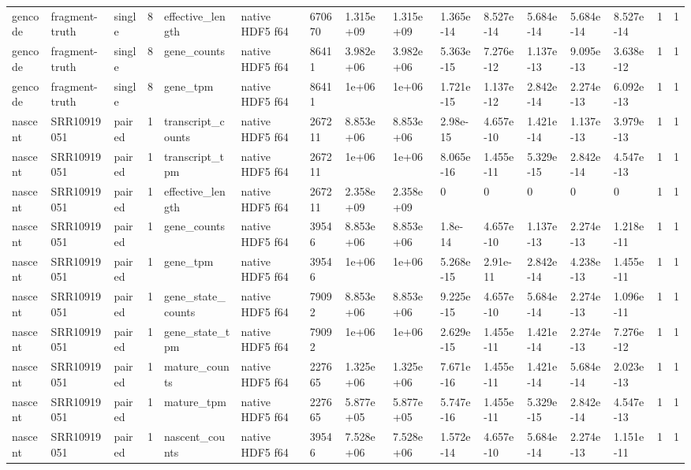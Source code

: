 \begin{tabular}{llllllllllllllll}
gencode & fragment-truth & single & 8 & effective\_length & native HDF5 f64 & 670670 & 1.315e+09 & 1.315e+09 & 1.365e-14 & 8.527e-14 & 5.684e-14 & 5.684e-14 & 8.527e-14 & 1 & 1 \\
gencode & fragment-truth & single & 8 & gene\_counts & native HDF5 f64 & 86411 & 3.982e+06 & 3.982e+06 & 5.363e-15 & 7.276e-12 & 1.137e-13 & 9.095e-13 & 3.638e-12 & 1 & 1 \\
gencode & fragment-truth & single & 8 & gene\_tpm & native HDF5 f64 & 86411 & 1e+06 & 1e+06 & 1.721e-15 & 1.137e-12 & 2.842e-14 & 2.274e-13 & 6.092e-13 & 1 & 1 \\
nascent & SRR10919051 & paired & 1 & transcript\_counts & native HDF5 f64 & 267211 & 8.853e+06 & 8.853e+06 & 2.98e-15 & 4.657e-10 & 1.421e-14 & 1.137e-13 & 3.979e-13 & 1 & 1 \\
nascent & SRR10919051 & paired & 1 & transcript\_tpm & native HDF5 f64 & 267211 & 1e+06 & 1e+06 & 8.065e-16 & 1.455e-11 & 5.329e-15 & 2.842e-14 & 4.547e-13 & 1 & 1 \\
nascent & SRR10919051 & paired & 1 & effective\_length & native HDF5 f64 & 267211 & 2.358e+09 & 2.358e+09 & 0 & 0 & 0 & 0 & 0 & 1 & 1 \\
nascent & SRR10919051 & paired & 1 & gene\_counts & native HDF5 f64 & 39546 & 8.853e+06 & 8.853e+06 & 1.8e-14 & 4.657e-10 & 1.137e-13 & 2.274e-13 & 1.218e-11 & 1 & 1 \\
nascent & SRR10919051 & paired & 1 & gene\_tpm & native HDF5 f64 & 39546 & 1e+06 & 1e+06 & 5.268e-15 & 2.91e-11 & 2.842e-14 & 4.238e-13 & 1.455e-11 & 1 & 1 \\
nascent & SRR10919051 & paired & 1 & gene\_state\_counts & native HDF5 f64 & 79092 & 8.853e+06 & 8.853e+06 & 9.225e-15 & 4.657e-10 & 5.684e-14 & 2.274e-13 & 1.096e-11 & 1 & 1 \\
nascent & SRR10919051 & paired & 1 & gene\_state\_tpm & native HDF5 f64 & 79092 & 1e+06 & 1e+06 & 2.629e-15 & 1.455e-11 & 1.421e-14 & 2.274e-13 & 7.276e-12 & 1 & 1 \\
nascent & SRR10919051 & paired & 1 & mature\_counts & native HDF5 f64 & 227665 & 1.325e+06 & 1.325e+06 & 7.671e-16 & 1.455e-11 & 1.421e-14 & 5.684e-14 & 2.023e-13 & 1 & 1 \\
nascent & SRR10919051 & paired & 1 & mature\_tpm & native HDF5 f64 & 227665 & 5.877e+05 & 5.877e+05 & 5.747e-16 & 1.455e-11 & 5.329e-15 & 2.842e-14 & 4.547e-13 & 1 & 1 \\
nascent & SRR10919051 & paired & 1 & nascent\_counts & native HDF5 f64 & 39546 & 7.528e+06 & 7.528e+06 & 1.572e-14 & 4.657e-10 & 5.684e-14 & 2.274e-13 & 1.151e-11 & 1 & 1 \\

\end{tabular}
